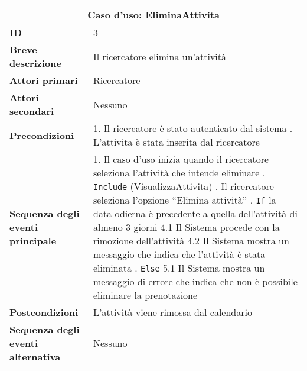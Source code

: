 \documentclass[11pt,a4paper]{report}
\begin{document}
\begin{table}[h!]
\centering
\renewcommand{\arraystretch}{1.3}
\begin{tabular}{|p{4.2cm}|p{10.2cm}|}
\hline
\multicolumn{2}{|c|}{\textbf{Caso d’uso: EliminaAttivita}} \\ \hline
\textbf{ID} & 3 \\ \hline
\textbf{Breve descrizione} & Il ricercatore elimina un'attività \\ \hline
\textbf{Attori primari} & Ricercatore \\ \hline
\textbf{Attori secondari} & Nessuno \\ \hline
\textbf{Precondizioni} &
1. Il ricercatore è stato autenticato dal sistema \newline
2. L'attivita è stata inserita dal ricercatore \\ \hline
\textbf{Sequenza degli eventi principale} &
1. Il caso d’uso inizia quando il ricercatore seleziona l'attività che intende eliminare \newline
2. \texttt{Include} (VisualizzaAttivita) \newline
3. Il ricercatore seleziona l’opzione “Elimina attività” \newline
4. \texttt{If} la data odierna è precedente a quella dell'attività di almeno 3 giorni \newline
\hspace*{0.5cm} 4.1 Il Sistema procede con la rimozione dell'attività \newline
\hspace*{0.5cm} 4.2 Il Sistema mostra un messaggio che indica che l'attività è stata eliminata \newline
5. \texttt{Else} \newline
\hspace*{0.5cm} 5.1 Il Sistema mostra un messaggio di errore che indica che non è possibile eliminare la prenotazione \\ \hline
\textbf{Postcondizioni} & L'attività viene rimossa dal calendario \\ \hline
\textbf{Sequenza degli eventi alternativa} & Nessuno \\ \hline
\end{tabular}
\end{table}

\space

\end{document}
